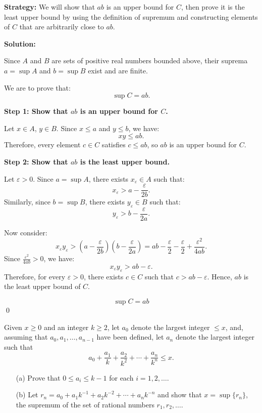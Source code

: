\noindent\textbf{Strategy:} We will show that $ab$ is an upper bound for $C$, then prove it is the least upper bound by using the definition of supremum and constructing elements of $C$ that are arbitrarily close to $ab$.

\bigskip\noindent\textbf{Solution:}

Since \( A \) and \( B \) are sets of positive real numbers bounded above, their suprema \( a = \sup A \) and \( b = \sup B \) exist and are finite.

We are to prove that:
\[
\sup C = ab.
\]

\textbf{Step 1: Show that \( ab \) is an upper bound for \( C \).}

Let \( x \in A \), \( y \in B \). Since \( x \leq a \) and \( y \leq b \), we have:
\[
xy \leq ab.
\]
Therefore, every element \( c \in C \) satisfies \( c \leq ab \), so \( ab \) is an upper bound for \( C \).

\textbf{Step 2: Show that \( ab \) is the least upper bound.}

Let \( \varepsilon > 0 \). Since \( a = \sup A \), there exists \( x_\varepsilon \in A \) such that:
\[
x_\varepsilon > a - \frac{\varepsilon}{2b}.
\]
Similarly, since \( b = \sup B \), there exists \( y_\varepsilon \in B \) such that:
\[
y_\varepsilon > b - \frac{\varepsilon}{2a}.
\]

Now consider:
\[
x_\varepsilon y_\varepsilon > \left(a - \frac{\varepsilon}{2b}\right)\left(b - \frac{\varepsilon}{2a}\right) = ab - \frac{\varepsilon}{2} - \frac{\varepsilon}{2} + \frac{\varepsilon^2}{4ab}.
\]
Since \( \frac{\varepsilon^2}{4ab} > 0 \), we have:
\[
x_\varepsilon y_\varepsilon > ab - \varepsilon.
\]
Therefore, for every \( \varepsilon > 0 \), there exists \( c \in C \) such that \( c > ab - \varepsilon \). Hence, \( ab \) is the least upper bound of \( C \).

\[
\boxed{\sup C = ab}
\]\qed


\begin{problembox}
\begin{problemstatement}
Given \( x \geq 0 \) and an integer \( k \geq 2 \), let \( a_0 \) denote the largest integer \( \leq x \), and, assuming that \( a_0, a_1, \dots, a_{n-1} \) have been defined, let \( a_n \) denote the largest integer such that
\[
a_0 + \frac{a_1}{k} + \frac{a_2}{k^2} + \cdots + \frac{a_n}{k^n} \leq x.
\]

\begin{enumerate}
\item[(a)] Prove that \( 0 \leq a_i \leq k - 1 \) for each \( i = 1, 2, \dots \).
\item[(b)] Let \( r_n = a_0 + a_1 k^{-1} + a_2 k^{-2} + \cdots + a_n k^{-n} \) and show that \( x = \sup \{ r_n \} \), the supremum of the set of rational numbers \( r_1, r_2, \dots \).
\end{enumerate}
\end{problemstatement}
\end{problembox}

